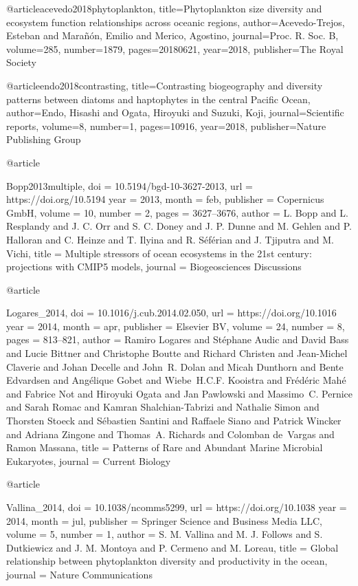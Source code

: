 {{{{{{{{{{{{@article{acevedo2018phytoplankton,
  title={Phytoplankton size diversity and ecosystem function relationships across oceanic regions},
  author={Acevedo-Trejos, Esteban and Mara{\~n}{\'o}n, Emilio and Merico, Agostino},
  journal={Proc. R. Soc. B},
  volume={285},
  number={1879},
  pages={20180621},
  year={2018},
  publisher={The Royal Society}
}


@article{endo2018contrasting,
  title={Contrasting biogeography and diversity patterns between diatoms and haptophytes in the central Pacific Ocean},
  author={Endo, Hisashi and Ogata, Hiroyuki and Suzuki, Koji},
  journal={Scientific reports},
  volume={8},
  number={1},
  pages={10916},
  year={2018},
  publisher={Nature Publishing Group}
}

@article{Bopp2013multiple,
	doi = {10.5194/bgd-10-3627-2013},
	url = {https://doi.org/10.5194%
	year = 2013,
	month = {feb},
	publisher = {Copernicus {GmbH}},
	volume = {10},
	number = {2},
	pages = {3627--3676},
	author = {L. Bopp and L. Resplandy and J. C. Orr and S. C. Doney and J. P. Dunne and M. Gehlen and P. Halloran and C. Heinze and T. Ilyina and R. S{\'{e}}f{\'{e}}rian and J. Tjiputra and M. Vichi},
	title = {Multiple stressors of ocean ecosystems in the 21st century: projections with {CMIP}5 models},
	journal = {Biogeosciences Discussions}
}


@article{Logares_2014,
	doi = {10.1016/j.cub.2014.02.050},
	url = {https://doi.org/10.1016%
	year = 2014,
	month = {apr},
	publisher = {Elsevier {BV}},
	volume = {24},
	number = {8},
	pages = {813--821},
	author = {Ramiro Logares and St{\'{e}}phane Audic and David Bass and Lucie Bittner and Christophe Boutte and Richard Christen and Jean-Michel Claverie and Johan Decelle and John~R. Dolan and Micah Dunthorn and Bente Edvardsen and Ang{\'{e}}lique Gobet and Wiebe~H.C.F. Kooistra and Fr{\'{e}}d{\'{e}}ric Mah{\'{e}} and Fabrice Not and Hiroyuki Ogata and Jan Pawlowski and Massimo~C. Pernice and Sarah Romac and Kamran Shalchian-Tabrizi and Nathalie Simon and Thorsten Stoeck and S{\'{e}}bastien Santini and Raffaele Siano and Patrick Wincker and Adriana Zingone and Thomas~A. Richards and Colomban de~Vargas and Ramon Massana},
	title = {Patterns of Rare and Abundant Marine Microbial Eukaryotes},
	journal = {Current Biology}
}


@article{Vallina_2014,
	doi = {10.1038/ncomms5299},
	url = {https://doi.org/10.1038%
	year = 2014,
	month = {jul},
	publisher = {Springer Science and Business Media {LLC}},
	volume = {5},
	number = {1},
	author = {S. M. Vallina and M. J. Follows and S. Dutkiewicz and J. M. Montoya and P. Cermeno and M. Loreau},
	title = {Global relationship between phytoplankton diversity and productivity in the ocean},
	journal = {Nature Communications}
}

}}}}}}}}}}}}}}}
